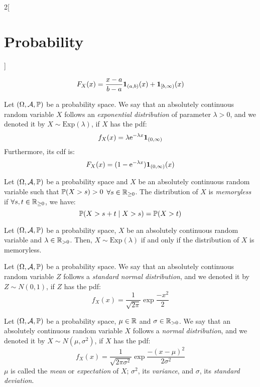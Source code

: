 \documentclass[../../../main.tex]{subfiles}
\begin{document}
\begin{multicols}{2}[\section{Probability}]
\begin{definition}
    $$F_X(x)=\frac{x-a}{b-a}\boldsymbol{\mathrm{1}}_{(a,b)}(x)+\boldsymbol{\mathrm{1}}_{[b,\infty)}(x)$$
  \end{definition}
  \begin{definition}
    Let $(\Omega,\mathcal{A},\mathbb{P})$ be a probability space. We say that an absolutely continuous random variable $X$ follows an \emph{exponential distribution} of parameter $\lambda>0$, and we denoted it by $X\sim \text{Exp}(\lambda)$, if $X$ has the pdf: $$f_X(x)=\lambda\mathrm{e}^{-\lambda x}\boldsymbol{\mathrm{1}}_{(0,\infty)}$$ Furthermore, its cdf is:
    $$F_X(x)=(1-\mathrm{e}^{-\lambda x})\boldsymbol{\mathrm{1}}_{(0,\infty)}(x)$$
  \end{definition}
  \begin{definition}
    Let $(\Omega,\mathcal{A},\mathbb{P})$ be a probability space and $X$ be an absolutely continuous random variable such that $\mathbb{P}(X >s)>0$ $\forall s\in\mathbb{R}_{\geq 0}$. The distribution of $X$ is \emph{memoryless} if $\forall s,t\in\mathbb{R}_{\geq 0}$, we have: $$\mathbb{P}(X>s+t\mid X >s)=\mathbb{P}(X>t)$$
  \end{definition}
  \begin{proposition}
    Let $(\Omega,\mathcal{A},\mathbb{P})$ be a probability space, $X$ be an absolutely continuous random variable and $\lambda\in\mathbb{R}_{>0}$. Then, $X\sim\text{Exp}(\lambda)$ if and only if the distribution of $X$ is memoryless.
  \end{proposition}
  \begin{definition}
    Let $(\Omega,\mathcal{A},\mathbb{P})$ be a probability space. We say that an absolutely continuous random variable $Z$ follows a \emph{standard normal distribution}, and we denoted it by $Z\sim N(0,1)$, if $Z$ has the pdf: $$f_X(x)=\frac{1}{\sqrt{2\pi}}\exp{\frac{-x^2}{2}}$$
  \end{definition}
  \begin{definition}
    Let $(\Omega,\mathcal{A},\mathbb{P})$ be a probability space, $\mu\in\mathbb{R}$ and $\sigma\in\mathbb{R}_{>0}$. We say that an absolutely continuous random variable $X$ follows a \emph{normal distribution}, and we denoted it by $X\sim N(\mu,\sigma^2)$, if $X$ has the pdf: $$f_X(x)=\frac{1}{\sqrt{2\pi\sigma^2}}\exp{\frac{-{(x-\mu)}^2}{2\sigma^2}}$$ $\mu$ is called the \emph{mean} or \emph{expectation} of $X$; $\sigma^2$, its \emph{variance}, and $\sigma$, its \emph{standard deviation}.
  \end{definition}
  \begin{center}
    \begin{minipage}{\linewidth}

\end{minipage}
\end{center}
\end{multicols}
\end{document}
